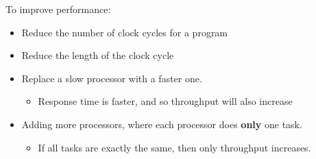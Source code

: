 \begin{frame}[fragile]
     To improve performance:
\begin{itemize}
    \item Reduce the number of clock cycles for a program
    \item Reduce the length of the clock cycle


    
 
\item Replace a slow processor with a faster one.
\begin{itemize}
\item Response time is faster, and so throughput will also increase
\end{itemize}

\item Adding more processors, where each processor does \textbf{only} one task.
\begin{itemize}
\item If all tasks are exactly the same, then only throughput increases.
\end{itemize}	
\end{itemize}
\end{frame}


